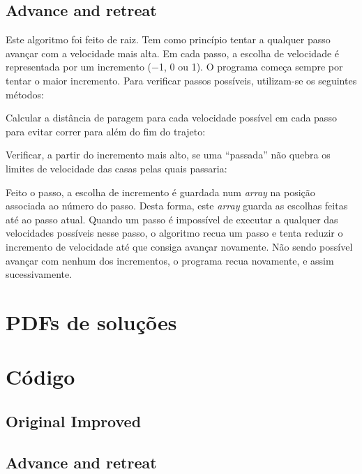 \documentclass[portuguese,11pt,a4paper,titlepage]{article}
\newcommand{\extrang}[1]{\textit{#1}}
\newcommand{\srcdir}{..}
\begin{document}
\subsection{Advance and retreat}
Este algoritmo foi feito de raiz. Tem como
princípio tentar a qualquer passo avançar com a velocidade mais alta.
Em cada passo, a escolha de velocidade é representada por um incremento
($-$1, 0 ou 1). O programa começa sempre por tentar o maior incremento.
Para verificar passos possíveis, utilizam-se os seguintes métodos:

Calcular a distância de paragem para cada velocidade possível em cada passo para evitar correr para além do fim do
trajeto:


Verificar, a partir do incremento mais alto, se uma ``passada'' não  quebra
os limites de velocidade das casas pelas quais passaria:


Feito o passo, a escolha de incremento é guardada num \extrang{array}
na posição associada ao número do passo. Desta forma, este \extrang{array}
guarda as escolhas feitas até ao passo atual.
Quando um passo é impossível de executar a qualquer das velocidades possíveis nesse
passo, o algoritmo recua um passo e tenta reduzir o incremento de velocidade até que
consiga avançar novamente. Não sendo possível avançar com nenhum dos incrementos,
o programa recua novamente, e assim sucessivamente.
\pagebreak
\section{PDFs de soluções}


\section{Código}
\subsection{Original Improved}

\pagebreak
\subsection{Advance and retreat}

\end{document}

